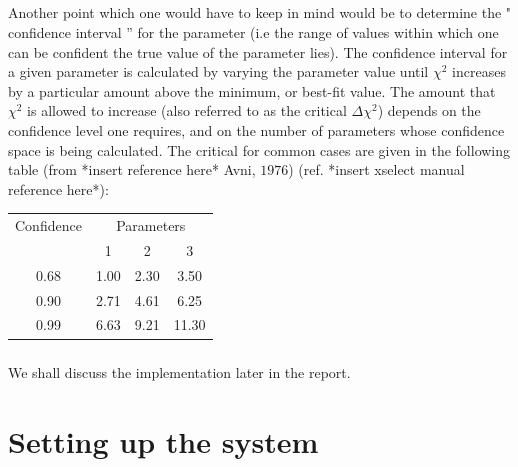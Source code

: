 \documentclass[a4paper,twoside]{report}
\numberwithin{equation}{section}
\begin{document}
\paragraph{}
Another point which one would have to keep in mind would be to determine the " confidence interval ” for the parameter (i.e the range of values within which one can be confident the true value of the parameter lies). The confidence interval for a given parameter is calculated by varying the parameter value until $\chi ^2$ increases by a particular amount above the minimum, or best-fit value. The amount that $\chi ^2$ is allowed to increase (also referred to as the critical $\Delta \chi ^2$) depends on the confidence level one requires, and on the number of parameters whose confidence space is being calculated. The critical for common cases are given in the following table (from *insert reference here* Avni, $1976$) (ref. *insert xselect manual reference here*):
\begin{center}
\begin{tabular}{ |c|c|c|c| } 
 \hline
 Confidence & \multicolumn{3}{|c|}{Parameters}\\
 & 1 & 2 & 3\\
 \hline 
 0.68 & 1.00 & 2.30 & 3.50 \\ 
 0.90 & 2.71 & 4.61 & 6.25 \\ 
 0.99 & 6.63 & 9.21 & 11.30 \\ 
 \hline
\end{tabular}
\end{center}
\paragraph{}
We shall discuss the implementation later in the report. 
\newpage
\chapter{Setting up the system}
\end{document}
